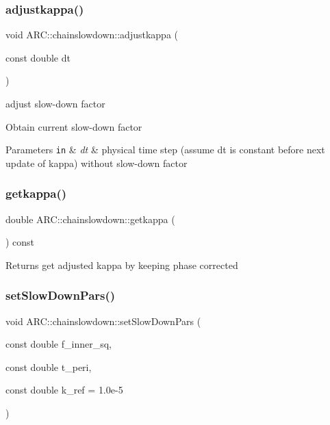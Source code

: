 \subsubsection{\texorpdfstring{adjustkappa()}{adjustkappa()}}
{\footnotesize\ttfamily void A\+R\+C\+::chainslowdown\+::adjustkappa (\begin{DoxyParamCaption}\item[{const double}]{dt }\end{DoxyParamCaption})\hspace{0.3cm}{\ttfamily [inline]}}



adjust slow-\/down factor 

Obtain current slow-\/down factor 
\begin{DoxyParams}[1]{Parameters}
\mbox{\tt in}  & {\em dt} & physical time step (assume dt is constant before next update of kappa) without slow-\/down factor \\
\hline
\end{DoxyParams}
\hypertarget{classARC_1_1chainslowdown_ac2504c790361770d774ad5db9afd9384}{}\label{classARC_1_1chainslowdown_ac2504c790361770d774ad5db9afd9384} 
\subsubsection{\texorpdfstring{getkappa()}{getkappa()}}
{\footnotesize\ttfamily double A\+R\+C\+::chainslowdown\+::getkappa (\begin{DoxyParamCaption}{ }\end{DoxyParamCaption}) const\hspace{0.3cm}{\ttfamily [inline]}}

\begin{DoxyReturn}{Returns}
get adjusted kappa by keeping phase corrected 
\end{DoxyReturn}
\hypertarget{classARC_1_1chainslowdown_ae60599148a33aa6b8f8a592015dcd5f7}{}\label{classARC_1_1chainslowdown_ae60599148a33aa6b8f8a592015dcd5f7} 
\subsubsection{\texorpdfstring{set\+Slow\+Down\+Pars()}{setSlowDownPars()}}
{\footnotesize\ttfamily void A\+R\+C\+::chainslowdown\+::set\+Slow\+Down\+Pars (\begin{DoxyParamCaption}\item[{const double}]{f\+\_\+inner\+\_\+sq,  }\item[{const double}]{t\+\_\+peri,  }\item[{const double}]{k\+\_\+ref = {\ttfamily 1.0e-\/5} }\end{DoxyParamCaption})\hspace{0.3cm}{\ttfamily [inline]}}



